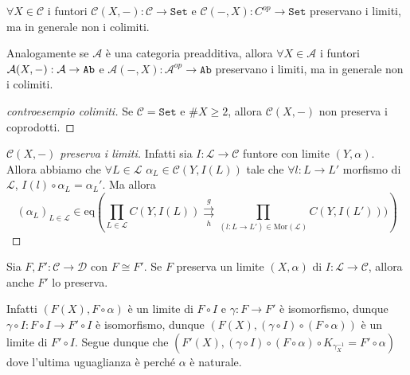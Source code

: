 \begin{example}{}
    \(\forall X \in \mathcal{C}\) i funtori \(\mathcal{C}{(X, -)} : \mathcal{C} \to \mathtt{Set}\) e \(\mathcal{C}{(-, X)} : C^{op} \to \mathtt{Set}\) preservano i limiti, ma in generale non i colimiti.

    Analogamente se \(\mathcal{A}\) è una categoria preadditiva, allora \(\forall X \in \mathcal{A}\) i funtori \\ \(\mathcal{A}{(X, \--)} : \mathcal{A} \to \mathtt{Ab}\) e \(\mathcal{A}{(-, X)}
    : \mathcal{A}^{op} \to \mathtt{Ab}\) preservano i limiti, ma in generale
    non i colimiti.

\begin{proof}[controesempio colimiti]
    Se \(\mathcal{C} = \mathtt{Set}\) e \(\# X \ge 2\), allora \(\mathcal{C}{(X, -)}\) non preserva i coprodotti. %
\end{proof}

\begin{proof}[\(\mathcal{C}{(X, -)}\) preserva i limiti]
    Infatti sia \(I : \mathcal{L} \to \mathcal{C}\) funtore con limite \({(Y, \alpha)}\). Allora abbiamo che \(\forall L \in \mathcal{L}\) \(\alpha_L \in \mathcal{C}{(Y, I{(L)})}\) tale che \(\forall l : L \to L'\) morfismo di \(\mathcal{L}\), \(I{(l)} \circ \alpha_L = \alpha_L'\). Ma allora
    \[
      {(\alpha_L)}_{L \in \mathcal{L}} \in \mathrm{eq}{\left( \prod_{L \in \mathcal{L}} C{(Y, I{(L)})} \underset{h}{\overset{g}{\rightrightarrows}} \prod_{{(l : L \to L')} \in \mathrm{Mor}{(\mathcal{L})}} C{(Y, I{(L')})}) \right)}
    \]
\end{proof}
\end{example}

\begin{remark}{}
    Sia \(F, F' : \mathcal{C} \to \mathcal{D}\) con \(F \cong F'\). Se \(F\)
    preserva un limite \({(X, \alpha)}\) di \(I : \mathcal{L} \to
    \mathcal{C}\), allora anche \(F'\) lo preserva. 

    Infatti \({(F{(X)}, F \circ \alpha)}\) è un limite di \(F \circ I\) e \(\gamma : F \to F'\) è
    isomorfismo, dunque \(\gamma \circ I : F \circ I \to  F' \circ I\) è
    isomorfismo, dunque \({(F{(X)}, {(\gamma \circ I)} \circ {(F \circ \alpha)})}\) è un limite di \(F' \circ I\).
    Segue dunque che \({(F'{(X)}, {(\gamma \circ I)} \circ {(F \circ \alpha)} \circ K_{\gamma_X^{-1}} = F' \circ \alpha)}\) dove l'ultima uguaglianza è perché \(\alpha\) è naturale.
\end{remark}

